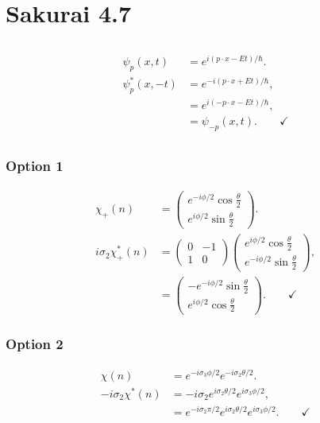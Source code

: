 \documentclass[
a4paper,
10pt,
twoside,
]{article}
\begin{document}
\section{Sakurai 4.7}
\subsection{}
\begin{align}
	\psi_{p}(x,t) &= e^{i(p \cdot x - Et)/\hbar}.\\
	\psi_{p}^*(x,-t) &= e^{-i(p \cdot x + Et)/\hbar},\\
	&= e^{i(-p \cdot x - Et)/\hbar},\\
	&= \psi_{-p}(x,t). \qquad \checkmark
\end{align}

\subsection{}
\subsubsection*{Option 1}
\begin{align}
	\chi_+(n) &= \begin{pmatrix}
			e^{-i\phi/2}\cos\frac{\theta}{2}\\
			e^{i\phi/2}\sin\frac{\theta}{2}
		\end{pmatrix}.\\
	i\sigma_2\chi_+^*(n) &= \begin{pmatrix}
			0 & -1\\ 1 & 0
		\end{pmatrix}\begin{pmatrix}
			e^{i\phi/2}\cos\frac{\theta}{2}\\
			e^{-i\phi/2}\sin\frac{\theta}{2}
		\end{pmatrix},\\
		&= \begin{pmatrix}
			-e^{-i\phi/2}\sin\frac{\theta}{2}\\
			e^{i\phi/2}\cos\frac{\theta}{2}
		\end{pmatrix}.\qquad \checkmark
\end{align}

\subsubsection*{Option 2}
\begin{align}
	\chi(n) &= e^{-i\sigma_3\phi/2}e^{-i\sigma_2\theta/2}.\\
	-i\sigma_2 \chi^*(n) &= -i\sigma_2 e^{i\sigma_2\theta/2}e^{i\sigma_3\phi/2},\\
	&= e^{-i\sigma_2\pi/2}e^{i\sigma_2\theta/2}e^{i\sigma_3\phi/2}. \qquad \checkmark
\end{align}
\end{document}
